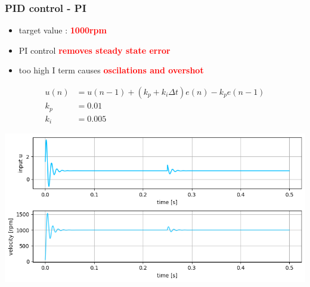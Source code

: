 \documentclass{beamer}
\begin{document}
\begin{frame}
  
  \frametitle{\textbf { PID control - PI}}

  \begin{itemize}
    \item  target value : \textcolor{red}{\textbf { 1000rpm}}
    \item  PI control \textcolor{red}{\textbf { removes steady state error}}
    \item  too high I term causes \textcolor{red}{\textbf { oscilations and overshot}}
  \end{itemize}

  \begin{align*}
    u(n)   &= u(n-1) + (k_p + k_i\Delta t) e(n) - k_pe(n-1) \\
    k_p    &= 0.01 \\
    k_i    &= 0.005
  \end{align*}

  {\centering \includegraphics[scale=0.4]{../images/motor_control/pid_pi_control_0.png}}

\end{frame}
\end{document}
